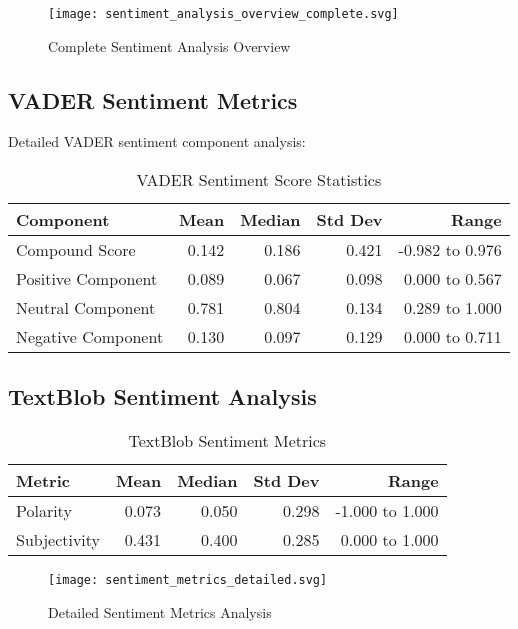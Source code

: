 \documentclass[12pt,a4paper]{article}
\begin{document}
\begin{figure}[H]
\centering
\texttt{[image: sentiment\_analysis\_overview\_complete.svg]}
\caption{Complete Sentiment Analysis Overview}
\label{fig:sentiment_overview}
\end{figure}

\subsection{VADER Sentiment Metrics}

Detailed VADER sentiment component analysis:

\begin{table}[H]
\centering
\caption{VADER Sentiment Score Statistics}
\begin{tabular}{@{}lrrrr@{}}
\toprule
\textbf{Component} & \textbf{Mean} & \textbf{Median} & \textbf{Std Dev} & \textbf{Range} \\
\midrule
Compound Score & 0.142 & 0.186 & 0.421 & -0.982 to 0.976 \\
Positive Component & 0.089 & 0.067 & 0.098 & 0.000 to 0.567 \\
Neutral Component & 0.781 & 0.804 & 0.134 & 0.289 to 1.000 \\
Negative Component & 0.130 & 0.097 & 0.129 & 0.000 to 0.711 \\
\bottomrule
\end{tabular}
\end{table}

\subsection{TextBlob Sentiment Analysis}

\begin{table}[H]
\centering
\caption{TextBlob Sentiment Metrics}
\begin{tabular}{@{}lrrrr@{}}
\toprule
\textbf{Metric} & \textbf{Mean} & \textbf{Median} & \textbf{Std Dev} & \textbf{Range} \\
\midrule
Polarity & 0.073 & 0.050 & 0.298 & -1.000 to 1.000 \\
Subjectivity & 0.431 & 0.400 & 0.285 & 0.000 to 1.000 \\
\bottomrule
\end{tabular}
\end{table}

\begin{figure}[H]
\centering
\texttt{[image: sentiment\_metrics\_detailed.svg]}
\caption{Detailed Sentiment Metrics Analysis}
\label{fig:sentiment_detailed}
\end{figure}
\end{document}
